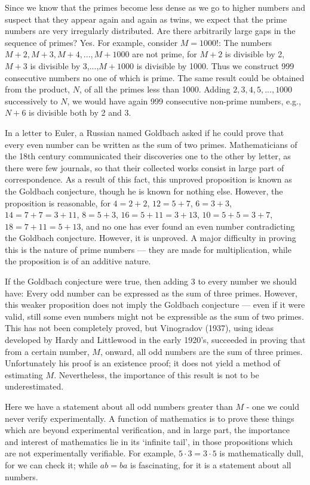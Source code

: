 \documentclass[a4paper]{article}
\begin{document}
Since we know that the primes become less dense as we go to higher numbers and suspect that they appear again and again as twins,
we expect that the prime numbers are very irregularly distributed. Are there arbitrarily large gaps in the sequence of primes?
Yes. For example, consider $M = 1000!$: The numbers $M+2, M+3, M+4,..., M+1000$ are not prime, for $M+2$ is divisible by 2,
$M+3$ is divisible by 3,...,$M+1000$ is divisible by 1000. Thus we construct 999 consecutive numbers no one of which is prime.
The same result could be obtained from the product, $N$, of all the primes less than 1000. Adding $2, 3, 4, 5,..., 1000$ successively
to $N$, we would have again 999 consecutive non-prime numbers, e.g., $N+6$ is divisible both by 2 and 3.

In a letter to Euler, a Russian named Goldbach asked if he could prove that every even number can be written as the sum of
two primes. Mathematicians of the 18th century communicated their discoveries one to the other by letter, as there were
few journals, so that their collected works consist in large part of correspondence. As a result of this fact, this unproved
proposition is known as the Goldbach conjecture, though he is known for nothing else. However, the proposition is reasonable,
for $4=2+2$, $12=5+7$, $6=3+3$, $14=7+7=3+11$, $8=5+3$, $16=5+11=3+13$, $10=5+5=3+7$, $18=7+11=5+13$, and no one has ever found
an even number contradicting the Goldbach conjecture. However, it is unproved. A major difficulty in proving this is the nature
of prime numbers --- they are made for multiplication, while the proposition is of an additive nature.

If the Goldbach conjecture were true, then adding 3 to every number we should have: Every odd number can be expressed as the sum
of three primes. However, this weaker proposition does not imply the Goldbach conjecture --- even if it were valid, still some
even numbers might not be expressible as the sum of two primes. This has not been completely proved, but Vinogradov (1937),
using ideas developed by Hardy and Littlewood in the early 1920's, succeeded in proving that from a certain number, $M$, onward,
all odd numbers are the sum of three primes. Unfortunately his proof is an existence proof; it does not yield a method of
estimating $M$. Nevertheless, the importance of this result is not to be underestimated.

Here we have a statement about all odd numbers greater than $M$ - one we could never verify experimentally. A function of
mathematics is to prove these things which are beyond experimental verification, and in large part, the importance and interest
of mathematics lie in its `infinite tail', in those propositions which are not experimentally verifiable. For example,
$5 \cdot 3 = 3 \cdot 5$ is mathematically dull, for we can check it; while $ab = ba$ is fascinating, for it is a statement
about all numbers.
\end{document}
